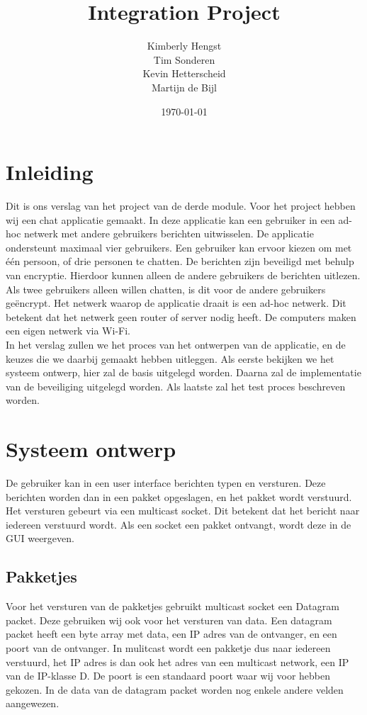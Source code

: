 \documentclass{article}
\title{Integration Project}
\author{Kimberly Hengst \\ Tim Sonderen \\ Kevin Hetterscheid \\ Martijn de Bijl}
\date{\today}
\begin{document}
\maketitle

\newpage

\tableofcontents

\section{Inleiding}
Dit is ons verslag van het project van de derde module. Voor het project hebben wij een chat applicatie gemaakt. In deze applicatie kan een gebruiker in een ad-hoc netwerk met andere gebruikers berichten uitwisselen. De applicatie ondersteunt maximaal vier gebruikers. Een gebruiker kan ervoor kiezen om met één persoon, of drie personen te chatten. De berichten zijn beveiligd met behulp van encryptie. Hierdoor kunnen alleen de andere gebruikers de berichten uitlezen. Als twee gebruikers alleen willen chatten, is dit voor de andere gebruikers geëncrypt. Het netwerk waarop de applicatie draait is een ad-hoc netwerk. Dit betekent dat het netwerk geen router of server nodig heeft. De computers  maken een eigen netwerk via Wi-Fi.
\\
In het verslag zullen we het proces van het ontwerpen van de applicatie, en de keuzes die we daarbij gemaakt hebben uitleggen. Als eerste bekijken we het systeem ontwerp, hier zal de basis uitgelegd worden. Daarna zal de implementatie van de beveiliging uitgelegd worden. Als laatste zal het test proces beschreven worden.

\newpage

\section{Systeem ontwerp}
De gebruiker kan in een user interface berichten typen en versturen. Deze berichten worden dan in een pakket opgeslagen, en het pakket wordt verstuurd. Het versturen gebeurt via een multicast socket. Dit betekent dat het bericht naar iedereen verstuurd wordt. Als een socket een pakket ontvangt, wordt deze in de GUI weergeven. 

\subsection{Pakketjes}
Voor het versturen van de pakketjes gebruikt multicast socket een Datagram packet. Deze gebruiken wij ook voor het versturen van data. Een datagram packet heeft een byte array met data, een IP adres van de ontvanger, en een poort van de ontvanger. In mulitcast wordt een pakketje dus naar iedereen verstuurd, het IP adres is dan ook het adres van een multicast network, een IP van de IP-klasse D. De poort is een standaard poort waar wij voor hebben gekozen. In de data van de datagram packet worden nog enkele andere velden aangewezen. %
\end{document}
